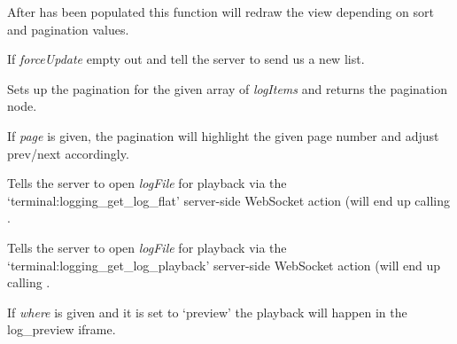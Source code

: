\documentclass[letterpaper,10pt,openany]{sphinxmanual}
\begin{document}

\begin{fulllineitems}
\label{Applications/terminal/plugin_logging:GateOne.TermLogging.loadLogs}
After  has been populated this function will redraw the view depending on sort and pagination values.

If \emph{forceUpdate} empty out  and tell the server to send us a new list.

\end{fulllineitems}


\begin{fulllineitems}
\label{Applications/terminal/plugin_logging:GateOne.TermLogging.loadPagination}
Sets up the pagination for the given array of \emph{logItems} and returns the pagination node.

If \emph{page} is given, the pagination will highlight the given page number and adjust prev/next accordingly.

\end{fulllineitems}


\begin{fulllineitems}
\label{Applications/terminal/plugin_logging:GateOne.TermLogging.openLogFlat}
Tells the server to open \emph{logFile} for playback via the `terminal:logging\_get\_log\_flat' server-side WebSocket action (will end up calling {\hyperref[Applications/terminal/plugin_logging:GateOne.TermLogging.displayFlatLogAction]{}}.

\end{fulllineitems}


\begin{fulllineitems}
\label{Applications/terminal/plugin_logging:GateOne.TermLogging.openLogPlayback}
Tells the server to open \emph{logFile} for playback via the `terminal:logging\_get\_log\_playback' server-side WebSocket action (will end up calling {\hyperref[Applications/terminal/plugin_logging:GateOne.TermLogging.displayPlaybackLogAction]{}}.

If \emph{where} is given and it is set to `preview' the playback will happen in the log\_preview iframe.

\end{fulllineitems}
\end{document}
